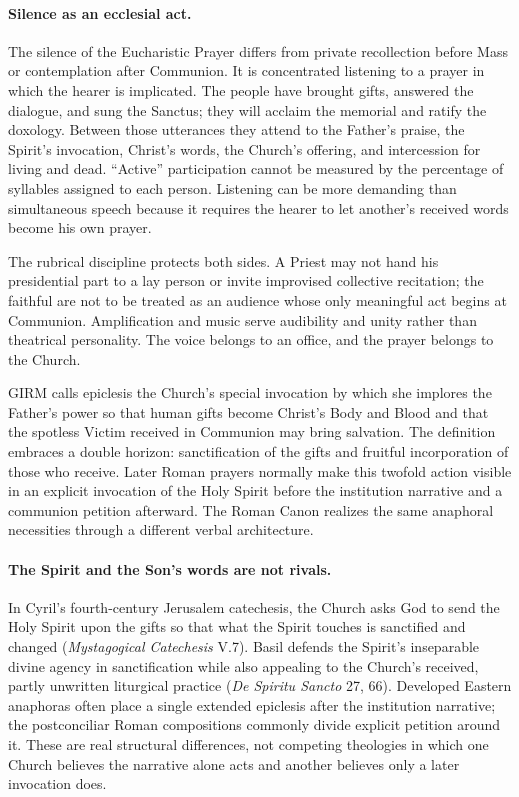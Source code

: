 \paragraph{Silence as an ecclesial act.}
The silence of the Eucharistic Prayer differs from private recollection before Mass or contemplation after Communion. It is concentrated listening to a prayer in which the hearer is implicated. The people have brought gifts, answered the dialogue, and sung the Sanctus; they will acclaim the memorial and ratify the doxology. Between those utterances they attend to the Father's praise, the Spirit's invocation, Christ's words, the Church's offering, and intercession for living and dead. ``Active'' participation cannot be measured by the percentage of syllables assigned to each person. Listening can be more demanding than simultaneous speech because it requires the hearer to let another's received words become his own prayer.

The rubrical discipline protects both sides. A Priest may not hand his presidential part to a lay person or invite improvised collective recitation; the faithful are not to be treated as an audience whose only meaningful act begins at Communion. Amplification and music serve audibility and unity rather than theatrical personality. The voice belongs to an office, and the prayer belongs to the Church.


GIRM calls epiclesis the Church's special invocation by which she implores the Father's power so that human gifts become Christ's Body and Blood and that the spotless Victim received in Communion may bring salvation. The definition embraces a double horizon: sanctification of the gifts and fruitful incorporation of those who receive. Later Roman prayers normally make this twofold action visible in an explicit invocation of the Holy Spirit before the institution narrative and a communion petition afterward. The Roman Canon realizes the same anaphoral necessities through a different verbal architecture.

\paragraph{The Spirit and the Son's words are not rivals.}
In Cyril's fourth-century Jerusalem catechesis, the Church asks God to send the Holy Spirit upon the gifts so that what the Spirit touches is sanctified and changed (\emph{Mystagogical Catechesis} V.7). Basil defends the Spirit's inseparable divine agency in sanctification while also appealing to the Church's received, partly unwritten liturgical practice (\emph{De Spiritu Sancto} 27, 66). Developed Eastern anaphoras often place a single extended epiclesis after the institution narrative; the postconciliar Roman compositions commonly divide explicit petition around it. These are real structural differences, not competing theologies in which one Church believes the narrative alone acts and another believes only a later invocation does.

